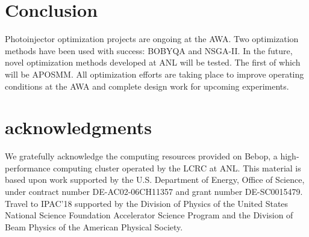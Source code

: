 \documentclass[letterpaper,  %
              ]{jacow-2_3}   %
\begin{document}
\section{Conclusion}
Photoinjector optimization projects are ongoing at the AWA.
Two optimization methods have been used with success:
BOBYQA and NSGA-II. In the future, novel optimization 
methods developed at ANL will be tested. The first of 
which will be APOSMM. All optimization efforts are taking 
place to improve operating conditions at the AWA and 
complete design work for upcoming experiments.

\section{acknowledgments}
We gratefully acknowledge the computing resources
provided on Bebop, a high-performance computing cluster
operated by the LCRC at ANL.
This material is based upon work supported by the 
U.S. Department of Energy, Office of Science, under 
contract number DE-AC02-06CH11357 and grant number DE-SC0015479. 
Travel to IPAC'18 supported by the Division of Physics 
of the United States National Science Foundation 
Accelerator Science Program and the Division of 
Beam Physics of the American Physical Society.
\end{document}
